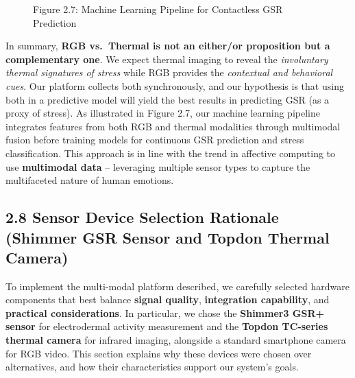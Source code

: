 \documentclass[12pt,a4paper]{article}
\begin{document}
\begin{figure}
\centering
{}
\caption{Figure 2.7: Machine Learning Pipeline for Contactless GSR Prediction}
\end{figure}

In summary, \textbf{RGB vs.~Thermal is not an either/or proposition but a complementary one}. We expect thermal imaging to reveal the \emph{involuntary thermal signatures of stress} while RGB provides the \emph{contextual and behavioral cues}. Our platform collects both synchronously, and our hypothesis is that using both in a predictive model will yield the best results in predicting GSR (as a proxy of stress). As illustrated in Figure 2.7, our machine learning pipeline integrates features from both RGB and thermal modalities through multimodal fusion before training models for continuous GSR prediction and stress classification. This approach is in line with the trend in affective computing to use \textbf{multimodal data} -- leveraging multiple sensor types to capture the multifaceted nature of human emotions.

\subsection{2.8 Sensor Device Selection Rationale (Shimmer GSR Sensor and Topdon Thermal Camera)}\label{sensor-device-selection-rationale-shimmer-gsr-sensor-and-topdon-thermal-camera}

To implement the multi-modal platform described, we carefully selected hardware components that best balance \textbf{signal quality}, \textbf{integration capability}, and \textbf{practical considerations}. In particular, we chose the \textbf{Shimmer3 GSR+ sensor} for electrodermal activity measurement and the \textbf{Topdon TC-series thermal camera} for infrared imaging, alongside a standard smartphone camera for RGB video. This section explains why these devices were chosen over alternatives, and how their characteristics support our system's goals.
\end{document}
